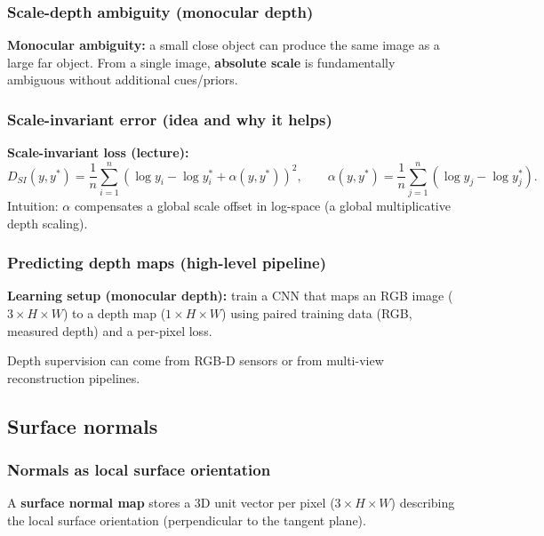 \documentclass[11pt,a4paper]{article}
\begin{document}
\subsubsection{Scale-depth ambiguity (monocular depth)}
\begin{intbox}
\textbf{Monocular ambiguity:} a small close object can produce the same image as a large far object.
From a single image, \textbf{absolute scale} is fundamentally ambiguous without additional cues/priors.
\end{intbox}

\subsubsection{Scale-invariant error (idea and why it helps)}
\begin{mathrule}
\textbf{Scale-invariant loss (lecture):}\;
\[
D_{SI}(y,y^\ast)=\frac{1}{n}\sum_{i=1}^{n}\left(\log y_i - \log y_i^\ast + \alpha(y,y^\ast)\right)^2,
\qquad
\alpha(y,y^\ast)=\frac{1}{n}\sum_{j=1}^{n}\left(\log y_j - \log y_j^\ast\right).
\]
Intuition: $\alpha$ compensates a global scale offset in log-space (a global multiplicative depth scaling).
\end{mathrule}

\subsubsection{Predicting depth maps (high-level pipeline)}
\begin{defbox}
\textbf{Learning setup (monocular depth):}\;
train a CNN that maps an RGB image ($3\times H\times W$) to a depth map ($1\times H\times W$) using paired training data
(RGB, measured depth) and a per-pixel loss.
\end{defbox}

\begin{notebox}
Depth supervision can come from RGB-D sensors or from multi-view reconstruction pipelines.
\end{notebox}

\subsection{Surface normals}

\subsubsection{Normals as local surface orientation}
\begin{defbox}
A \textbf{surface normal map} stores a 3D unit vector per pixel ($3\times H\times W$) describing the local surface orientation
(perpendicular to the tangent plane).
\end{defbox}
\end{document}
